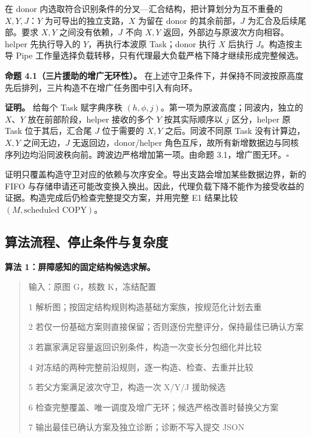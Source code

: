 \documentclass[anonymous,notoc]{gmcm2026}
\begin{document}
在 donor 内选取符合识别条件的分叉---汇合结构，把计算划分为互不重叠的 \(X,Y,J\)：\(Y\) 为可导出的独立支路，\(X\) 为留在 donor 的其余前部，\(J\) 为汇合及后续尾部。要求 \(X,Y\) 之间没有依赖，\(J\) 不向 \(X,Y\) 返回，外部边与原波次方向相容。helper 先执行导入的 \(Y\)，再执行本波原 Task；donor 执行 \(X\) 后执行 \(J\)。构造按主导 Pipe 工作量选择负载转移，只有代理最大负载严格下降才继续形成完整候选。

\textbf{命题 4.1（三片援助的增广无环性）。} 在上述守卫条件下，并保持不同波按原高度先后排列，三片构造不在增广任务图中引入有向环。

\textbf{证明。} 给每个 Task 赋字典序秩 \((h,\phi,j)\)。第一项为原波高度；同波内，独立的 \(X\)、\(Y\) 放在前部阶段，helper 接收的多个 \(Y\) 按其实际顺序以 \(j\) 区分，helper 原 Task 位于其后，汇合尾 \(J\) 位于需要的 \(X,Y\) 之后。同波不同原 Task 没有计算边，\(X,Y\) 之间无边，\(J\) 无返回边，donor/helper 角色互斥，故所有新增数据边与同核序列边均沿同波秩向前。跨波边严格增加第一项。由命题 3.1，增广图无环。\(\square\)

证明只覆盖构造守卫对应的依赖与次序安全。导出支路会增加某些数据边界，新的 FIFO 与存储申请还可能改变换入换出。因此，代理负载下降不能作为接受收益的证据。构造完成后仍检查完整提交方案，并用完整 E1 结果比较 \((M,\text{scheduled COPY})\)。

\subsection{算法流程、停止条件与复杂度}\label{ux7b97ux6cd5ux6d41ux7a0bux505cux6b62ux6761ux4ef6ux4e0eux590dux6742ux5ea6}

\textbf{算法 1：屏障感知的固定结构候选求解。}

\begin{quote}
输入：原图 G，核数 K，冻结配置

1 解析图；按固定结构规则构造基础方案族，按规范化计划去重

2 若仅一份基础方案则直接保留；否则逐份完整评分，保持最佳已确认方案

3 若赢家满足容量返回识别条件，构造一次变长分包细化并比较

4 对冻结的两种完整前沿规则，逐一构造、检查、去重并比较

5 若父方案满足波次守卫，构造一次 X/Y/J 援助候选

6 检查完整覆盖、唯一调度及增广无环；候选严格改善时替换父方案

7 输出最佳已确认方案及独立诊断；诊断不写入提交 JSON
\end{quote}
\end{document}
